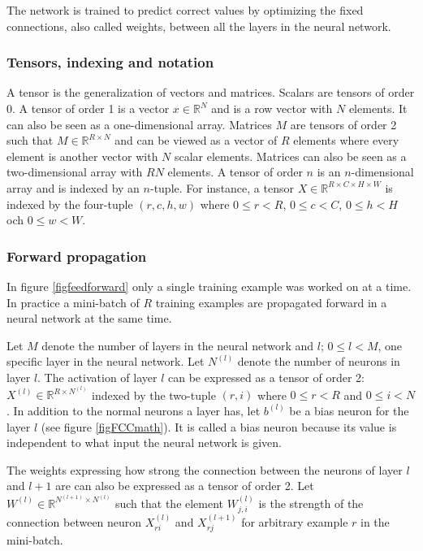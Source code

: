 \documentclass[a4paper,11pt,twoside]{article}
\begin{document}
The network is trained to predict correct values by optimizing the fixed connections, also called weights, between all the layers in the neural network. \cite{cs231n}

\subsubsection{Tensors, indexing and notation}
A tensor is the generalization of vectors and matrices. Scalars are tensors of order 0. A tensor of order 1 is a vector $x \in \mathbb{R}^N$ and is a row vector with $N$ elements. It can also be seen as a one-dimensional array. Matrices $M$ are tensors of order 2 such that $M \in \mathbb{R}^{R \times N}$ and can be viewed as a vector of $R$ elements where every element is another vector with $N$ scalar elements. Matrices can also be seen as a two-dimensional array with $RN$ elements. A tensor of order $n$ is an $n$-dimensional array and is indexed by an $n$-tuple. For instance, a tensor $X \in \mathbb{R}^{R \times C \times H \times W}$ is indexed by the four-tuple $(r,c,h,w)$ where $0 \leq r < R$, $0 \leq c < C$, $0 \leq h < H$ och $0 \leq w < W$. \cite{cs231n}

\subsubsection{Forward propagation}
In figure \ref{figfeedforward} only a single training example was worked on at a time. In practice a mini-batch of $R$ training examples are propagated forward in a neural network at the same time. \cite{cs231n} \cite{wikiStanford}

Let $M$ denote the number of layers in the neural network and $l$; $0 \leq l < M$, one specific layer in the neural network. Let $N^{(l)}$ denote the number of neurons in layer $l$. The activation of layer $l$ can be expressed as a tensor of order 2: $X^{(l)} \in \mathbb{R}^{R \times N^{(l)}}$ indexed by the two-tuple $(r,i)$ where $0 \leq r < R$ and $0 \leq i < N$. In addition to the normal neurons a layer has, let $b^{(l)}$ be a bias neuron for the layer $l$ (see figure \ref{figFCCmath}). It is called a bias neuron because its value is independent to what input the neural network is given. \cite{cs231n} \cite{wikiStanford}

The weights expressing how strong the connection between the neurons of layer $l$ and $l+1$ are can also be expressed as a tensor of order 2. Let $W^{(l)} \in \mathbb{R}^{N^{(l+1)}  \times N^{(l)}}$ such that the element $W_{j, i}^{(l)}$ is the strength of the connection between neuron $X_{ri}^{(l)}$ and $X_{rj}^{(l+1)}$ for arbitrary example $r$ in the mini-batch. \cite{cs231n} \cite{wikiStanford}
\end{document}
